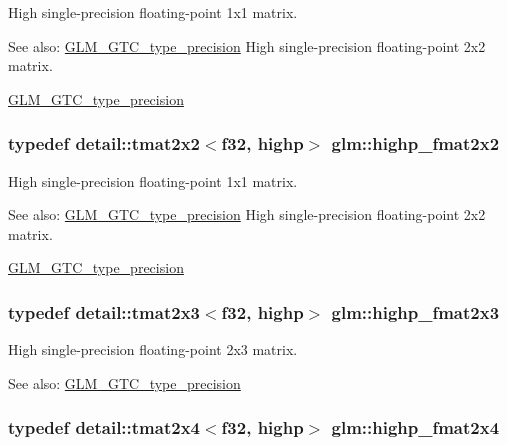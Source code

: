 High single-precision floating-point 1x1 matrix. \begin{Desc}
\item[See also:]\hyperlink{group__gtc__type__precision}{GLM\_\-GTC\_\-type\_\-precision} High single-precision floating-point 2x2 matrix. 

\hyperlink{group__gtc__type__precision}{GLM\_\-GTC\_\-type\_\-precision} \end{Desc}
\hypertarget{group__gtc__type__precision_geb76f1230ecfd4c80635d3c618405e31}{
\subsubsection[highp\_\-fmat2x2]{\setlength{\rightskip}{0pt plus 5cm}typedef detail::tmat2x2$<$f32, highp$>$ {\bf glm::highp\_\-fmat2x2}}}
\label{group__gtc__type__precision_geb76f1230ecfd4c80635d3c618405e31}


High single-precision floating-point 1x1 matrix. \begin{Desc}
\item[See also:]\hyperlink{group__gtc__type__precision}{GLM\_\-GTC\_\-type\_\-precision} High single-precision floating-point 2x2 matrix. 

\hyperlink{group__gtc__type__precision}{GLM\_\-GTC\_\-type\_\-precision} \end{Desc}
\hypertarget{group__gtc__type__precision_g53c126d1650b460bc7496a6fd5e5e764}{
\subsubsection[highp\_\-fmat2x3]{\setlength{\rightskip}{0pt plus 5cm}typedef detail::tmat2x3$<$f32, highp$>$ {\bf glm::highp\_\-fmat2x3}}}
\label{group__gtc__type__precision_g53c126d1650b460bc7496a6fd5e5e764}


High single-precision floating-point 2x3 matrix. \begin{Desc}
\item[See also:]\hyperlink{group__gtc__type__precision}{GLM\_\-GTC\_\-type\_\-precision} \end{Desc}
\hypertarget{group__gtc__type__precision_g5df8430c47272adc901ef224d85a9c4d}{
\subsubsection[highp\_\-fmat2x4]{\setlength{\rightskip}{0pt plus 5cm}typedef detail::tmat2x4$<$f32, highp$>$ {\bf glm::highp\_\-fmat2x4}}}
\label{group__gtc__type__precision_g5df8430c47272adc901ef224d85a9c4d}


